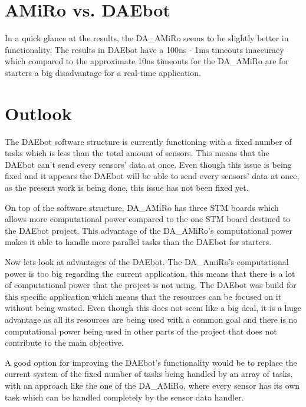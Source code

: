\documentclass[12pt]{report}%
\begin{document}
\section{AMiRo vs. DAEbot}



In a quick glance at the results, the DA\_AMiRo seems to be slightly better in functionality. The results in DAEbot have a 100ns - 1ms timeouts inaccuracy which compared to the approximate 10ns timeouts for the DA\_AMiRo are for starters a big disadvantage for a real-time application.

\section{Outlook}
The DAEbot software structure is currently functioning with a fixed number of tasks which is less than the total amount of sensors. This means that the DAEbot can't send every sensors' data at once. Even though this issue is being fixed and it appears the DAEbot will be able to send every sensors' data at once, as the present work is being done, this issue has not been fixed yet.

On top of the software structure, DA\_AMiRo has three STM boards which allows more computational power compared to the one STM board destined to the DAEbot project. This advantage of the DA\_AMiRo's computational power makes it able to handle more parallel tasks than the DAEbot for starters.

Now lets look at advantages of the DAEbot. The DA\_AmiRo's computational power is too big regarding the current application, this means that there is a lot of computational power that the project is not using. The DAEbot was build for this specific application which means that the resources can be focused on it without being wasted. Even though this does not seem like a big deal, it is a huge advantage as all its resources are being used with a common goal and there is no computational power being used in other parts of the project that does not contribute to the main objective.

A good option for improving the DAEbot's functionality would be to replace the current system of the fixed number of tasks being handled by an array of tasks, with an approach like the one of the DA\_AMiRo, where every sensor has its own task which can be handled completely by the sensor data handler.

\printbibliography
\nocite{*}
\end{document}
